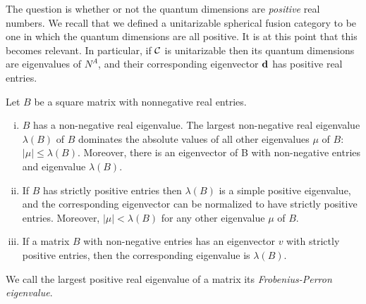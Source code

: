 \begin{rem}
The question is whether or not the quantum dimensions are {\em positive} real numbers. We recall that we defined a unitarizable spherical fusion category to be one in which the quantum dimensions are all positive. It is at this point that this becomes relevant. In particular, if ${\mathcal C}$ is unitarizable then its quantum dimensions are eigenvalues of $N^A$, and their corresponding eigenvector $\bold{d}$ has positive real entries.
\end{rem}

\begin{thrm} Let $B$ be a square matrix with nonnegative real entries.

\begin{enumerate}[(i)]
\item $B$ has a non-negative real eigenvalue. The largest non-negative real eigenvalue $\lambda(B)$ of $B$ dominates the absolute values of all other eigenvalues $\mu$ of $B$: $|\mu|\leq \lambda(B)$. Moreover, there is an eigenvector of B with non-negative entries
and eigenvalue $\lambda(B)$.
\item If $B$ has strictly positive entries then $\lambda(B)$ is a simple positive eigenvalue, and the corresponding eigenvector can be normalized to have strictly positive entries. Moreover, $|\mu| < \lambda(B)$ for any other eigenvalue $\mu$ of $B$.
\item If a matrix $B$ with non-negative entries has an eigenvector $v$ with strictly
positive entries, then the corresponding eigenvalue is $\lambda(B)$.
\end{enumerate}
\end{thrm}

\begin{rem}
We call the largest positive real eigenvalue of a matrix its {\em Frobenius-Perron eigenvalue}.
\end{rem}


